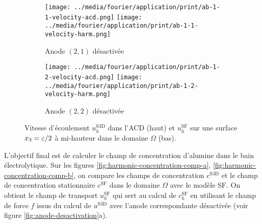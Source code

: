 \begin{figure}[h]
  \begin{center}
    \begin{subfigure}[t]{\textwidth}
      \begin{center}
        \texttt{[image: ../media/fourier/application/print/ab-1-1-velocity-acd.png]}
        \texttt{[image: ../media/fourier/application/print/ab-1-1-velocity-harm.png]}
        \caption{Anode $(2,1)$ désactivée}
        \label{fig:}
      \end{center}
    \end{subfigure}

    \begin{subfigure}[t]{\textwidth}
      \begin{center}
        \texttt{[image: ../media/fourier/application/print/ab-1-2-velocity-acd.png]}
        \texttt{[image: ../media/fourier/application/print/ab-1-2-velocity-harm.png]}
        \caption{Anode $(2,2)$ désactivée}
        \label{fig:}
      \end{center}
    \end{subfigure}


    \caption{Vitesse d'écoulement $u_h^\mathrm{S3D}$ dans l'ACD (haut)
      et $u_h^\mathrm{SF}$ sur une surface $x_3 = \varepsilon / 2$ à
      mi-hauteur dans le domaine $\Omega$ (bas).}

    \label{fig:harmonic-velocity-comp-b}
  \end{center}
\end{figure}

L'objectif final est de calculer le champ de concentration d'alumine
dans le bain électrolytique. Sur les figures
\ref{fig:harmonic-concentration-comp-a},
\ref{fig:harmonic-concentration-comp-b}, on compare les champs de
concentration $c^\mathrm{S3D}$ et le champ de concentration
stationnaire $c^\mathrm{SF}$ dans le domaine $\Omega$ avec le modèle
SF. On obtient le champ de transport $u_h^\mathrm{SF}$ qui sert au
calcul de $c_h^\mathrm{SF}$ en utilisant le champ de force $f$ issus
du calcul de $u^\mathrm{S3D}$ avec l'anode correspondante désactivée
(voir figure \ref{fig:anode-desactivation}a).

